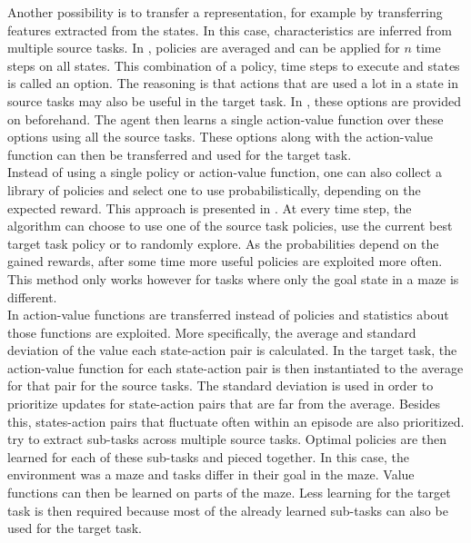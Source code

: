 Another possibility is to transfer a representation, for example by transferring features extracted from the states. In this case, characteristics are inferred from multiple source tasks.
In \cite{Bernstein99reusingold}, policies are averaged and can be applied for $n$ time steps on all states.
This combination of a policy, time steps to execute and states is called an option.
The reasoning is that actions that are used a lot in a state in source tasks may also be useful in the target task. In \cite{perkins1999using}, these options are provided on beforehand.
The agent then learns a single action-value function over these options using all the source tasks.
These options along with the action-value function can then be transferred and used for the target task.\\

Instead of using a single policy or action-value function, one can also collect a library of policies and select one to use probabilistically, depending on the expected reward. This approach is presented in \cite{fernandez2006probabilistic,fernandez2013learning}. At every time step, the algorithm can choose to use one of the source task policies, use the current best target task policy or to randomly explore. As the probabilities depend on the gained rewards, after some time more useful policies are exploited more often. This method only works however for tasks where only the goal state in a maze is different.\\

In \cite{conf/cira/TanakaY03} action-value functions are transferred instead of policies and statistics about those functions are exploited.
More specifically, the average and standard deviation of the value each state-action pair is calculated.
In the target task, the action-value function for each state-action pair is then instantiated to the average for that pair for the source tasks.
The standard deviation is used in order to prioritize updates for state-action pairs that are far from the average.
Besides this, states-action pairs that fluctuate often within an episode are also prioritized.\\

\cite{journals/ml/FosterD02} try to extract sub-tasks across multiple source tasks.
Optimal policies are then learned for each of these sub-tasks and pieced together.
In this case, the environment was a maze and tasks differ in their goal in the maze.
Value functions can then be learned on parts of the maze.
Less learning for the target task is then required because most of the already learned sub-tasks can also be used for the target task.\\

